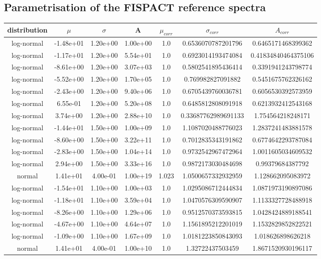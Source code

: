 \documentclass[a4paper, 12pt]{article}
\begin{document}
\begin{appendices}
\section{Parametrisation of the FISPACT reference spectra}
\begin{table}[H]
\begin{tabular}{ccccccc}
distribution&$\mu$&$\sigma$&A&$\mu_{corr}$&$\sigma_{corr}$&$A_{corr}$\\
\hline
log-normal&-1.48e+01&1.20e+00&1.00e+00&1.0&0.6536070787201796&0.6465171468399362\\
log-normal&-1.17e+01&1.20e+00&5.54e+01&1.0&0.6923014193474084&0.41834840464375106\\
log-normal&-8.61e+00&1.20e+00&3.07e+03&1.0&0.5802541895436414&0.3391941243798774\\
log-normal&-5.52e+00&1.20e+00&1.70e+05&1.0&0.769982827091882&0.5451675762326162\\
log-normal&-2.43e+00&1.20e+00&9.40e+06&1.0&0.6705439760036781&0.6056530392573959\\
log-normal&6.55e-01&1.20e+00&5.20e+08&1.0&0.6485812808091918&0.6213932412543168\\
log-normal&3.74e+00&1.20e+00&2.88e+10&1.0&0.33687762989691133&1.754564218248171\\
\hline
log-normal&-1.44e+01&1.50e+00&1.00e+09&1.0&1.1087020488776023&1.2837241483881578\\
log-normal&-8.60e+00&1.50e+00&3.22e+11&1.0&0.7012835343191862&0.6774642293787084\\
log-normal&-2.83e+00&1.50e+00&1.04e+14&1.0&0.9732542967472964&1.0011605034609532\\
log-normal&2.94e+00&1.50e+00&3.33e+16&1.0&0.9872173030484698&0.99379684387792\\
normal&1.41e+01&4.00e-01&1.00e+19&1.023&1.0500657332932959&1.128662095083972\\
\hline
log-normal&-1.54e+01&1.10e+00&1.00e+03&1.0&1.0295086712444834&1.0871973190897086\\
log-normal&-1.18e+01&1.10e+00&3.59e+04&1.0&1.0470576309590907&1.1133327728488918\\
log-normal&-8.26e+00&1.10e+00&1.29e+06&1.0&0.9512570373593815&1.0428424889188541\\
log-normal&-4.67e+00&1.10e+00&4.64e+07&1.0&1.1561895212201019&1.1532829852822521\\
log-normal&-1.09e+00&1.10e+00&1.67e+09&1.0&1.0181223850843093&1.018626898626218\\
normal&1.41e+01&4.00e-01&1.00e+10&1.0&1.32722437503459&1.8671520930196117\\

\end{tabular}
\end{table}
\end{appendices}
\end{document}
